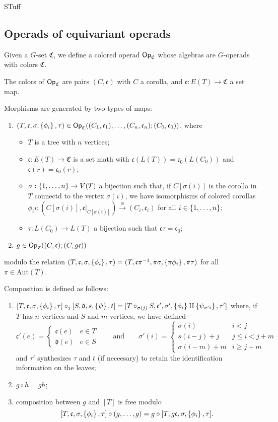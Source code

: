 \documentclass[psamsfonts,onesided,10pt,letterpaper]{amsart}%
\renewcommand{\C}{\ensuremath{\mathfrak{C}}}
\renewcommand{\fc}{\ensuremath{\mathfrak{c}}}
\renewcommand{\1}{\ensuremath{\mathbb{id}}}
\begin{document}
STuff

\subsection{Operads of equivariant operads}

Given a $G$-set $\C$, we define a colored operad $\Op_\C$ whose algebras are $G$-operads with colors $\C$.

The colors of $\Op_\C$ are pairs $(C,\fc)$ with $C$ a corolla, and $\fc: E(T) \to \C$ a set map.

Morphisms are generated by two types of maps:
\begin{enumerate}
\item $(T,\fc,\sigma,\set{\phi_i},\tau)\in \Op_\C((C_1,\fc_1), \ldots, (C_n,\fc_n); (C_0,\fc_0))$, where
  \begin{itemize}
  \item $T$ is a tree with $n$ vertices;
  \item $\fc: E(T)\to \C$ is a set math with $\fc(L(T)) = \fc_0(L(C_0))$ and $\fc(r) = \fc_0(r)$;
  \item $\sigma: \left\{1,\ldots, n\right\}\to V(T)$ a bijection such that, if $C[\sigma(i)]$ is the corolla in $T$ connectd to the vertex $\sigma(i)$, we have isomorphisms of colored corollas $\phi_ii: (C[\sigma(i)], \fc|_{C[\sigma(i)]})\xrightarrow{\cong} (C_i, \fc_i)$ for all $i\in \left\{1,\ldots, n\right\}$;
  \item $\tau: L(C_0)\to L(T)$ a bijection such that $\fc\tau = \fc_0$;
  \end{itemize}
\item $g\in \Op_\C((C,\fc); (C,g\fc))$
\end{enumerate}
modulo the relation $(T,\fc,\sigma,\set{\phi_i},\tau) = (T,\fc\pi^{-1},\pi\sigma,\set{\pi\phi_i},\pi\tau)$ for all $\pi\in \mathrm{Aut}(T)$.

Composition is defined as follows:
\begin{enumerate}
\item $[T,\fc,\sigma,\set{\phi_i},\tau] \circ_j [S,\mathfrak{d}, s, \set{\psi}, t] = [T\circ_{\sigma(j)}S, \fc', \sigma', \set{\phi_i}\amalg\set{\psi_{\sigma' i}}, \tau']$ where, if $T$ has $n$ vertices and $S$ and $m$ vertices, we have defined
\[
\fc'(e) = \begin{cases}\fc(e) & e\in T\\ \mathfrak{d}(e) & e\in S\end{cases} \qquad \mbox{and} \qquad 
\sigma'(i) =
\begin{cases}
  \sigma(i) & i< j\\
  s(i-j)+j & j\leq i < j+m\\
  \sigma(i-m)+m & i\geq j+m
\end{cases}
\]
and $\tau'$ synthesizes $\tau$ and $t$ (if neceesary) to retain the identification information on the leaves;
\item $g\circ h = gh$;
\item composition between $g$ and $[T]$ is free modulo
\[
[T,\fc,\sigma,\set{\phi_i},\tau] \circ (g,\ldots,g) = g\circ [T,g\fc,\sigma,\set{\phi_i}, \tau].
\]
\end{enumerate}
\end{document}
